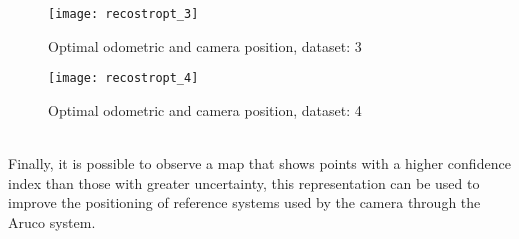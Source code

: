 \begin{figure}[!htb]
   {\texttt{[image: recostropt\_3]}}\,
   \caption{Optimal odometric and camera position, dataset: 3}
   \label{fig:OptiOdo3}
\end{figure}
\begin{figure}[!htb]
   {\texttt{[image: recostropt\_4]}}
\caption{Optimal odometric and camera position, dataset: 4}
\label{fig:OptiOdo4}
\end{figure}
\\Finally, it is possible to observe a map that shows points with a higher confidence index than those with greater uncertainty, this representation can be used to improve the positioning of reference systems used by the camera through the Aruco system.
